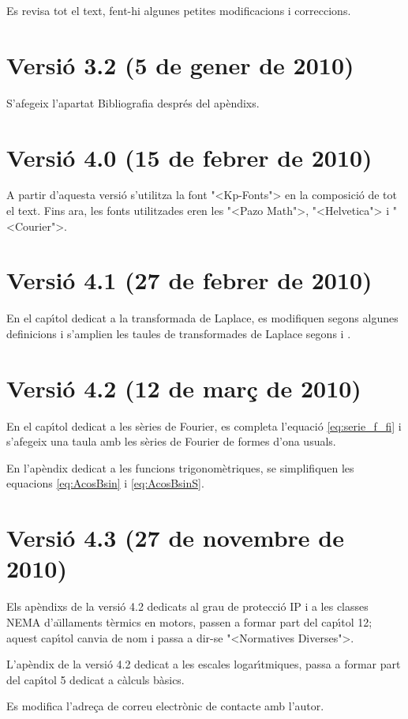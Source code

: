Es revisa tot el text, fent-hi algunes petites modificacions i
correccions.

\section*{Versi\'{o} 3.2 (5 de gener de 2010)}
S'afegeix l'apartat Bibliografia despr\'{e}s del ap\`{e}ndixs.


\section*{Versi\'{o} 4.0 (15 de febrer de 2010)}
A partir d'aquesta versi\'{o} s'utilitza la font {"<}Kp-Fonts{">} en la composici\'{o} de tot el text. Fins ara, les fonts utilitzades eren les {"<}Pazo Math{">}, {"<}Helvetica{">} i {"<}Courier{">}.


\section*{Versi\'{o} 4.1 (27 de febrer de 2010)}
En el cap\'{\i}tol dedicat a la transformada de Laplace, es modifiquen segons \cite{SCH} algunes definicions  i s'amplien les taules de transformades de Laplace segons \cite{RASd} i \cite{SCH}.

\section*{Versi\'{o} 4.2 (12 de mar\c{c} de 2010)}
En el cap\'{\i}tol dedicat a les s\`{e}ries de Fourier, es completa l'equaci\'{o} \eqref{eq:serie_f_fi} i s'afegeix una taula amb les s\`{e}ries de Fourier de formes d'ona usuals.

En l'ap\`{e}ndix dedicat a les funcions trigonom\`{e}triques, se simplifiquen les equacions \eqref{eq:AcosBsin} i \eqref{eq:AcosBsinS}.

\section*{Versi\'{o} 4.3 (27 de novembre de 2010)}
Els ap\`{e}ndixs de la versi\'{o} 4.2 dedicats al grau de protecci\'{o} IP i  a les classes NEMA d'a\"{\i}llaments t\`{e}rmics en motors, passen a formar part del cap\'{\i}tol 12; aquest cap\'{\i}tol canvia de nom i passa a dir-se {"<}Normatives Diverses{">}.

L'ap\`{e}ndix de la versi\'{o} 4.2 dedicat a les escales logar\'{\i}tmiques, passa a formar part del cap\'{\i}tol 5 dedicat a c\`{a}lculs b\`{a}sics. 

Es modifica l'adre\c{c}a de correu electr\`{o}nic de contacte amb l'autor.
